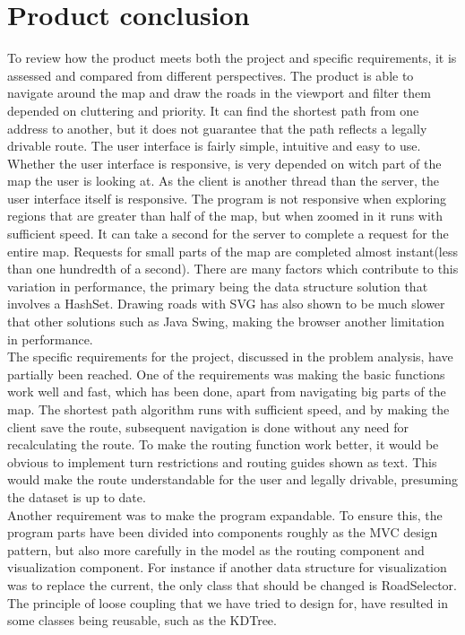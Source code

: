 \documentclass[a4paper,10pt,titlepage]{article}
\begin{document}
			
	\newpage
	\section{Product conclusion}
	To review how the product meets both the project and specific requirements, it is assessed and compared from different perspectives. The product is able to navigate around the map and draw the roads in the viewport and filter them depended on cluttering and priority. It can find the shortest path from one address to another, but it does not guarantee that the path reflects a legally drivable route. The user interface is fairly simple, intuitive and easy to use. Whether the user interface is responsive, is very depended on witch part of the map the user is looking at. As the client is another thread than the server, the user interface itself is responsive. The program is not responsive when exploring regions that are greater than half of the map, but when zoomed in it runs with sufficient speed. It can take a second for the server to complete a request for the entire map. Requests for small parts of the map are completed almost instant(less than one hundredth of a second). There are many factors which contribute to this variation in performance, the primary being the data structure solution that involves a HashSet. Drawing roads with SVG has also shown to be much slower that other solutions such as Java Swing, making the browser another limitation in performance.\\
The specific requirements for the project, discussed in the problem analysis, have partially been reached. One of the requirements was making the basic functions work well and fast, which has been done, apart from navigating big parts of the map. The shortest path algorithm runs with sufficient speed, and by making the client save the route, subsequent navigation is done without any need for recalculating the route. To make the routing function work better, it would be obvious to implement turn restrictions and routing guides shown as text. This would make the route understandable for the user and legally drivable, presuming the dataset is up to date.\\
Another requirement was to make the program expandable. To ensure this, the program parts have been divided into components roughly as the MVC design pattern, but also more carefully in the model as the routing component and visualization component. For instance if another data structure for visualization was to replace the current, the only class that should be changed is RoadSelector. The principle of loose coupling that we have tried to design for, have resulted in some classes being reusable, such as the KDTree.\\
\end{document}
